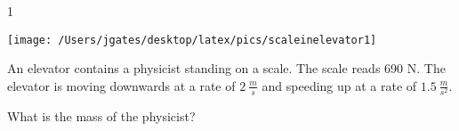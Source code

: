 
\AddToShipoutPicture*{\BackgroundPic}

\addtocounter {ProbNum} {1}

\begin{floatingfigure}[r]{.2\textwidth}
\texttt{[image: /Users/jgates/desktop/latex/pics/scaleinelevator1]}
\end{floatingfigure}
 
{\bf \Large{}} An elevator contains a physicist standing on a scale. The scale reads 690 N. The elevator is moving downwards at a rate of ${2~\tfrac{m}{s}}$ and speeding up at a rate of ${1.5~\tfrac{m}{s^2}}$.

\bigskip
What is the mass of the physicist?




\vfill
\newpage
